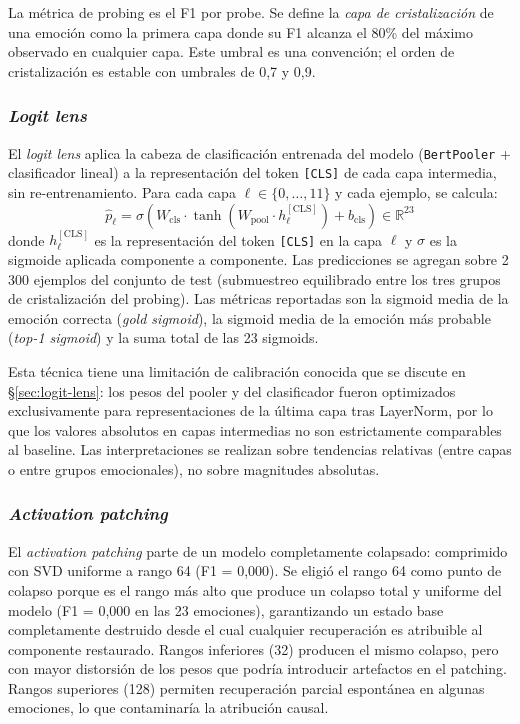 La métrica de probing es el F1 por probe. Se define la \emph{capa de
cristalización} de una emoción como la primera capa donde su F1 alcanza el
80\% del máximo observado en cualquier capa. Este umbral es una convención;
el orden de cristalización es estable con umbrales de 0{,}7 y 0{,}9.

\subsubsection{\emph{Logit lens}}
\label{sec:met-logitlens}

El \emph{logit lens} \cite{nostalgebraist2020logit} aplica la cabeza de
clasificación entrenada del modelo (\texttt{BertPooler} + clasificador
lineal) a la representación del token \texttt{[CLS]} de cada capa
intermedia, sin re-entrenamiento. Para cada capa $\ell \in \{0, \ldots, 11\}$
y cada ejemplo, se calcula:
\begin{equation}
    \hat{p}_\ell = \sigma\left(W_{\text{cls}} \cdot \tanh\left(W_{\text{pool}} \cdot h_\ell^{[\text{CLS}]}\right) + b_{\text{cls}}\right) \in \mathbb{R}^{23}
    \label{eq:logitlens}
\end{equation}
donde $h_\ell^{[\text{CLS}]}$ es la representación del token \texttt{[CLS]}
en la capa $\ell$ y $\sigma$ es la sigmoide aplicada componente a
componente. Las predicciones se agregan sobre 2\,300 ejemplos del conjunto
de test (submuestreo equilibrado entre los tres grupos de cristalización del
probing). Las métricas reportadas son la sigmoid media de la emoción
correcta (\emph{gold sigmoid}), la sigmoid media de la emoción más probable
(\emph{top-1 sigmoid}) y la suma total de las 23 sigmoids.

Esta técnica tiene una limitación de calibración conocida que se discute en
\S\ref{sec:logit-lens}: los pesos del pooler y del clasificador fueron
optimizados exclusivamente para representaciones de la última capa tras
LayerNorm, por lo que los valores absolutos en capas intermedias no son
estrictamente comparables al baseline. Las interpretaciones se realizan
sobre tendencias relativas (entre capas o entre grupos emocionales), no
sobre magnitudes absolutas.

\subsubsection{\emph{Activation patching}}
\label{sec:met-patching}

El \emph{activation patching} parte de un modelo completamente colapsado:
comprimido con SVD uniforme a rango 64 (F1 = 0{,}000). Se eligió el rango 64
como punto de colapso porque es el rango más alto que produce un colapso
total y uniforme del modelo (F1 = 0{,}000 en las 23 emociones), garantizando
un estado base completamente destruido desde el cual cualquier recuperación
es atribuible al componente restaurado. Rangos inferiores (32) producen el
mismo colapso, pero con mayor distorsión de los pesos que podría introducir
artefactos en el patching. Rangos superiores (128) permiten recuperación
parcial espontánea en algunas emociones, lo que contaminaría la atribución
causal.

